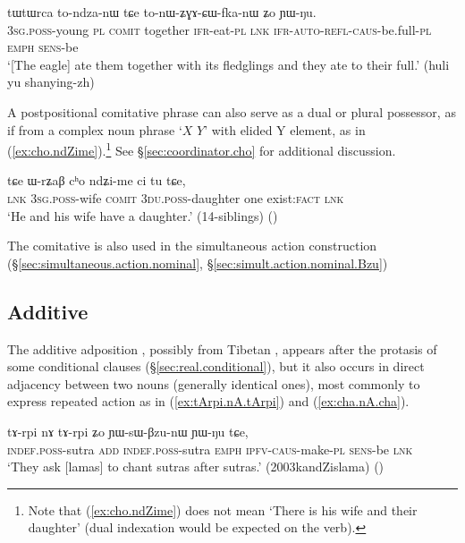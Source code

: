 \begin{exe}
\ex \label{ex:WpW.ra.cho}
\gll [ɯ-pɯ ra cʰo] tɯtɯrca to-ndza-nɯ tɕe to-nɯ-ʑɣɤ-ɕɯ-fka-nɯ ʑo ɲɯ-ŋu. \\
\textsc{3sg}.\textsc{poss}-young \textsc{pl} \textsc{comit} together \textsc{ifr}-eat-\textsc{pl} \textsc{lnk} \textsc{ifr}-\textsc{auto}-\textsc{refl}-\textsc{caus}-be.full-\textsc{pl} \textsc{emph} \textsc{sens}-be \\
\glt `[The eagle] ate them together with its fledglings and they ate to their full.' (huli yu shanying-zh)
\end{exe}

A postpositional comitative phrase can also serve as a dual or plural possessor, as if from a complex noun phrase `$X$  $Y$' with elided Y element, as in (\ref{ex:cho.ndZime}).\footnote{Note that (\ref{ex:cho.ndZime}) does not mean `There is his wife and their daughter' (dual indexation would be expected on the verb).} See §\ref{sec:coordinator.cho} for additional discussion.

\begin{exe}
\ex \label{ex:cho.ndZime}
\gll tɕe ɯ-rʑaβ cʰo ndʑi-me ci tu tɕe, \\
\textsc{lnk} \textsc{3sg}.\textsc{poss}-wife \textsc{comit} \textsc{3du}.\textsc{poss}-daughter one exist:\textsc{fact} \textsc{lnk} \\
\glt `He and his wife have a daughter.' (14-siblings)
()
\end{exe}
 
The comitative is also used in the simultaneous action construction (§\ref{sec:simultaneous.action.nominal}, §\ref{sec:simult.action.nominal.Bzu})
 
\subsection{Additive} \label{sec:additive.nA} 
The additive adposition , possibly from Tibetan , appears after the protasis of some conditional clauses (§\ref{sec:real.conditional}), but it also occurs in direct adjacency between two nouns (generally identical ones), most commonly to express  repeated action as in (\ref{ex:tArpi.nA.tArpi}) and (\ref{ex:cha.nA.cha}).
 
\begin{exe}
\ex  \label{ex:tArpi.nA.tArpi}
\gll tɤ-rpi nɤ tɤ-rpi ʑo ɲɯ-sɯ-βzu-nɯ ɲɯ-ŋu tɕe, \\
\textsc{indef}.\textsc{poss}-sutra \textsc{add} \textsc{indef}.\textsc{poss}-sutra \textsc{emph} \textsc{ipfv}-\textsc{caus}-make-\textsc{pl} \textsc{sens}-be \textsc{lnk} \\
\glt `They ask [lamas] to chant sutras after sutras.' (2003kandZislama)
()
\end{exe} 

